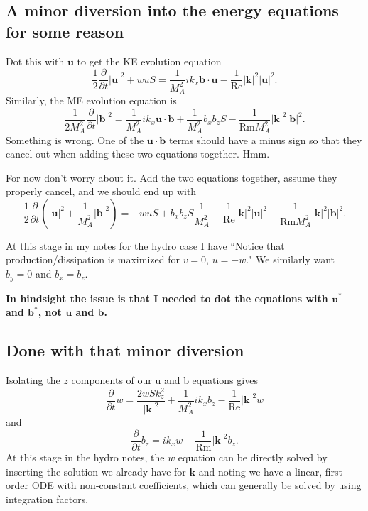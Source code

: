 \documentclass[aps,pop,preprint]{revtex4}
\begin{document}
\subsection{A minor diversion into the energy equations for some reason}
Dot this with $\mathbf{u}$ to get the KE evolution equation
\begin{equation} \label{eq:KE-evolution}
\frac{1}{2} \frac{\partial}{\partial t} |\mathbf{u}|^2 + wuS = \frac{1}{M_A^2} i k_x \mathbf{b} \cdot \mathbf{u} - \frac{1}{\mathrm{Re}} |\mathbf{k}|^2 |\mathbf{u}|^2.
\end{equation}
Similarly, the ME evolution equation is
\begin{equation} \label{eq:ME-evolution}
\frac{1}{2 M_A^2}\frac{\partial}{\partial t} |\mathbf{b}|^2 = \frac{1}{M_A^2} i k_x \mathbf{u} \cdot \mathbf{b} + \frac{1}{M_A^2}b_x b_z S - \frac{1}{\mathrm{Rm} M_A^2} |\mathbf{k}|^2 |\mathbf{b}|^2.
\end{equation}
Something is wrong. One of the $\mathbf{u} \cdot \mathbf{b}$ terms should have a minus sign so that they cancel out when adding these two equations together. Hmm.

For now don't worry about it. Add the two equations together, assume they properly cancel, and we should end up with
\begin{equation} \label{eq:TE-evolution}
\frac{1}{2} \frac{\partial}{\partial t} ( |\mathbf{u}|^2 + \frac{1}{M_A^2} |\mathbf{b}|^2 ) = - wuS + b_xb_z S \frac{1}{M_A^2} - \frac{1}{\mathrm{Re}} |\mathbf{k}|^2 |\mathbf{u}|^2 - \frac{1}{\mathrm{Rm} M_A^2} |\mathbf{k}|^2 |\mathbf{b}|^2.
\end{equation}

At this stage in my notes for the hydro case I have ``Notice that production/dissipation is maximized for $v=0$, $u=-w$." We similarly want $b_y = 0$ and $b_x = b_z$.

\textbf{In hindsight the issue is that I needed to dot the equations with $\mathbf{u}^*$ and $\mathbf{b}^*$, not $\mathbf{u}$ and $\mathbf{b}$.}

\subsection{Done with that minor diversion}
Isolating the $z$ components of our u and b equations gives
\begin{equation} \label{eq:w-no-p}
\frac{\partial}{\partial t} w = \frac{2wSk_z^2}{|\mathbf{k}|^2} + \frac{1}{M_A^2} i k_x b_z - \frac{1}{\mathrm{Re}} |\mathbf{k}|^2 w
\end{equation}
and
\begin{equation} \label{eq:bz}
\frac{\partial}{\partial t} b_z = i k_x w - \frac{1}{\mathrm{Rm}} |\mathbf{k}|^2 b_z.
\end{equation}
At this stage in the hydro notes, the $w$ equation can be directly solved by inserting the solution we already have for $\mathbf{k}$ and noting we have a linear, first-order ODE with non-constant coefficients, which can generally be solved by using integration factors.
\end{document}

